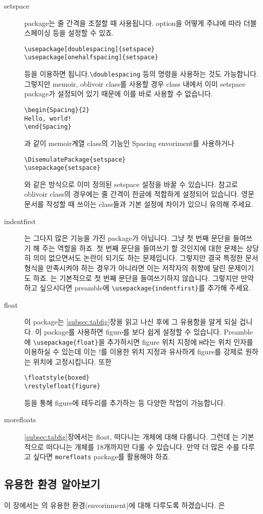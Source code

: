 \begin{description}
\item[setspace] package는 줄 간격을 조절할 때 사용됩니다. option을 어떻게 주냐에 따라 더블스페이싱 등을 설정할 수 있죠.
\begin{Verbatim}
\usepackage[doublespacing]{setspace}  \usepackage[onehalfspacing]{setspace}
\end{Verbatim}
등을 이용하면 됩니다.\verb|\doublespacing| 등의 명령을 사용하는 것도 가능합니다. 그렇지만 memoir, oblivoir class를 사용할 경우 class 내에서 이미 setspace package가 설정되어 있기 때문에 이를 바로 사용할 수 없습니다.
\begin{Verbatim}
\begin{Spacing}{2}
Hello, world!
\end{Spacing}
\end{Verbatim}
과 같이 memoir계열 class의 기능인 Spacing envoriment를 사용하거나
\begin{Verbatim}
\DisemulatePackage{setspace}
\usepackage{setspace}
\end{Verbatim}
와 같은 방식으로 이미 정의된 setspace 설정을 바꿀 수 있습니다.
참고로 oblivoir class의 경우에는 줄 간격이 한글에 적합하게 설정되어 있습니다.
영문 문서를 작성할 때 쓰이는  class들과 기본 설정에 차이가 있으니 유의해 주세요.
\item[indentfirst] 는 그다지 많은 기능을 가진 package가 아닙니다. 그냥 첫 번째 문단을 들여쓰기 해 주는 역할을 하죠. 첫 번째 문단을 들여쓰기 할 것인지에 대한 문제는 상당히 의미 없으면서도 논란이 되기도 하는 문제입니다. 그렇지만 결국 특정한 문서 형식을 만족시켜야 하는 경우가 아니라면 이는 저작자의 취향에 달린 문제이기도 하죠. \lt 는 기본적으로 첫 번째 문단을 들여쓰기하지 않습니다. 그렇지만 만약 하고 싶으시다면 preamble에 \verb|\usepackage{indentfirst}|를 추가해 주세요.

\item[float] 이 package는 \ref{subsec:tabfig}장을 읽고 나신 후에 그 유용함을 알게 되실 겁니다. 이 package를 사용하면 figure를 보다 쉽게 설정할 수 있습니다. Preamble에 \verb|\usepackage{float}|을 추가하시면 figure 위치 지정에 \verb|H|라는 위치 인자를 이용하실 수 있는데 이는 !를 이용한 위치 지정과 유사하게 figure를 강제로 원하는 위치에 고정시킵니다. 또한
\begin{Verbatim}
\floatstyle{boxed}
\restylefloat{figure}
\end{Verbatim}
등을 통해 figure에 테두리를 추가하는 등 다양한 작업이 가능합니다.

\item[morefloats] \ref{subsec:tabfig}장에서는 float, 떠다니는 개체에 대해 다룹니다. 그런데 \lt 는 기본적으로 떠다니는 개체를 18개까지만 다룰 수 있습니다. 만약 더 많은 수를 다루고 싶다면 \verb|morefloats| package를 활용해야 하죠.
\end{description}

\subsection{유용한 환경 알아보기}
\label{sec:advanced-environment}
이 장에서는 \lt 의 유용한 환경(envorinment)에 대해 다루도록 하겠습니다. \lt 은 





